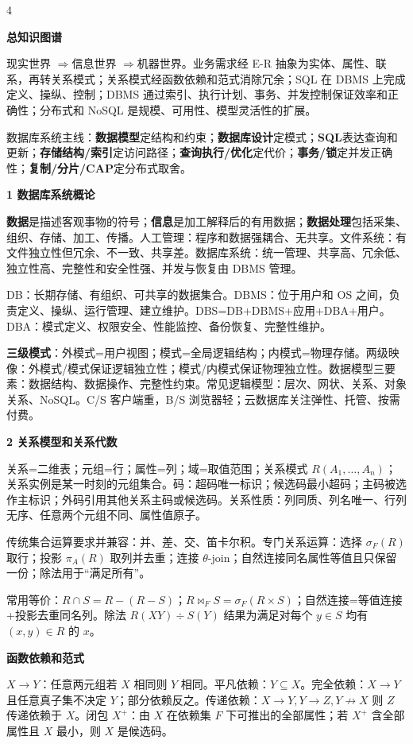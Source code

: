 \documentclass[UTF8]{ctexart}
\newcommand{\blk}[1]{\vspace{0.8pt}\noindent\colorbox{black!10}{\parbox{\dimexpr\linewidth-2\fboxsep}{\bfseries #1}}\vspace{0.6pt}}
\newcommand{\tri}{$\Rightarrow$}
\newcommand{\kw}[1]{\textbf{#1}}
\begin{document}
\fontsize{8.55pt}{9.0pt}\selectfont

\begin{multicols*}{4}
\blk{总知识图谱}
现实世界 \tri 信息世界 \tri 机器世界。业务需求经 E-R 抽象为实体、属性、联系，再转关系模式；关系模式经函数依赖和范式消除冗余；SQL 在 DBMS 上完成定义、操纵、控制；DBMS 通过索引、执行计划、事务、并发控制保证效率和正确性；分布式和 NoSQL 是规模、可用性、模型灵活性的扩展。

数据库系统主线：\kw{数据模型}定结构和约束；\kw{数据库设计}定模式；\kw{SQL}表达查询和更新；\kw{存储结构/索引}定访问路径；\kw{查询执行/优化}定代价；\kw{事务/锁}定并发正确性；\kw{复制/分片/CAP}定分布式取舍。

\blk{1 数据库系统概论}
\kw{数据}是描述客观事物的符号；\kw{信息}是加工解释后的有用数据；\kw{数据处理}包括采集、组织、存储、加工、传播。人工管理：程序和数据强耦合、无共享。文件系统：有文件独立性但冗余、不一致、共享差。数据库系统：统一管理、共享高、冗余低、独立性高、完整性和安全性强、并发与恢复由 DBMS 管理。

DB：长期存储、有组织、可共享的数据集合。DBMS：位于用户和 OS 之间，负责定义、操纵、运行管理、建立维护。DBS=DB+DBMS+应用+DBA+用户。DBA：模式定义、权限安全、性能监控、备份恢复、完整性维护。

\kw{三级模式}：外模式=用户视图；模式=全局逻辑结构；内模式=物理存储。两级映像：外模式/模式保证逻辑独立性；模式/内模式保证物理独立性。数据模型三要素：数据结构、数据操作、完整性约束。常见逻辑模型：层次、网状、关系、对象关系、NoSQL。C/S 客户端重，B/S 浏览器轻；云数据库关注弹性、托管、按需付费。

\blk{2 关系模型和关系代数}
关系=二维表；元组=行；属性=列；域=取值范围；关系模式 $R(A_1,\ldots,A_n)$；关系实例是某一时刻的元组集合。码：超码唯一标识；候选码最小超码；主码被选作主标识；外码引用其他关系主码或候选码。关系性质：列同质、列名唯一、行列无序、任意两个元组不同、属性值原子。

传统集合运算要求并兼容：并、差、交、笛卡尔积。专门关系运算：选择 $\sigma_F(R)$ 取行；投影 $\pi_A(R)$ 取列并去重；连接 $\theta$-join；自然连接同名属性等值且只保留一份；除法用于“满足所有”。

常用等价：$R\cap S=R-(R-S)$；$R\bowtie_F S=\sigma_F(R\times S)$；自然连接=等值连接+投影去重同名列。除法 $R(XY)\div S(Y)$ 结果为满足对每个 $y\in S$ 均有 $(x,y)\in R$ 的 $x$。

\blk{函数依赖和范式}
$X\to Y$：任意两元组若 $X$ 相同则 $Y$ 相同。平凡依赖：$Y\subseteq X$。完全依赖：$X\to Y$ 且任意真子集不决定 $Y$；部分依赖反之。传递依赖：$X\to Y,Y\to Z,Y\nrightarrow X$ 则 $Z$ 传递依赖于 $X$。闭包 $X^+$：由 $X$ 在依赖集 $F$ 下可推出的全部属性；若 $X^+$ 含全部属性且 $X$ 最小，则 $X$ 是候选码。


\end{multicols*}
\end{document}
